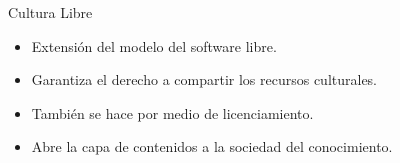 \documentclass{beamer}
\begin{document}
\begin{frame}{Cultura Libre}
  \begin{itemize}
  \item Extensión del modelo del software libre.
  \item Garantiza el derecho a compartir los recursos culturales.
  \item También se hace por medio de licenciamiento.%
  \item Abre la capa de contenidos a la sociedad del conocimiento.
  \end{itemize}
\end{frame}











\end{document}
